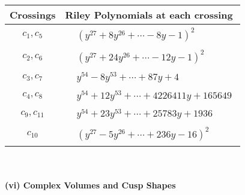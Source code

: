 \documentclass[1p]{elsarticle_modified}
\theoremstyle{definition}
\begin{document}
\begin{tabular}{m{50pt}|m{274pt}}
Crossings & \hspace{64pt}Riley Polynomials at each crossing \\
\hline $$\begin{aligned}c_{1},c_{5}\end{aligned}$$&$\begin{aligned}
&(y^{27}+8 y^{26}+\cdots-8 y-1)^{2}
\end{aligned}$\\
\hline $$\begin{aligned}c_{2},c_{6}\end{aligned}$$&$\begin{aligned}
&(y^{27}+24 y^{26}+\cdots-12 y-1)^{2}
\end{aligned}$\\
\hline $$\begin{aligned}c_{3},c_{7}\end{aligned}$$&$\begin{aligned}
&y^{54}-8 y^{53}+\cdots+87 y+4
\end{aligned}$\\
\hline $$\begin{aligned}c_{4},c_{8}\end{aligned}$$&$\begin{aligned}
&y^{54}+12 y^{53}+\cdots+4226411 y+165649
\end{aligned}$\\
\hline $$\begin{aligned}c_{9},c_{11}\end{aligned}$$&$\begin{aligned}
&y^{54}+23 y^{53}+\cdots+25783 y+1936
\end{aligned}$\\
\hline $$\begin{aligned}c_{10}\end{aligned}$$&$\begin{aligned}
&(y^{27}-5 y^{26}+\cdots+236 y-16)^{2}
\end{aligned}$\\
\hline
\end{tabular}\\~\\
\newpage\flushleft \textbf{(vi) Complex Volumes and Cusp Shapes}
\end{document}
